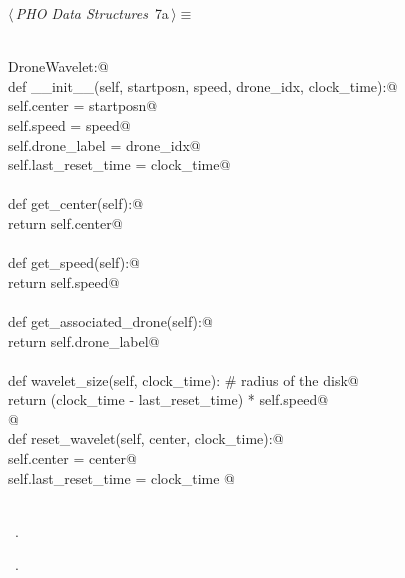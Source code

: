 \documentclass[12.0pt]{report}
\begin{document}
\begin{flushleft} \small
\begin{minipage}{\linewidth}\label{scrap2}\raggedright\small
{} $\langle\,${\itshape PHO Data Structures}\nobreak\ {\footnotesize {7a}}$\,\rangle\equiv$
\vspace{-1ex}
\begin{list}{}{} \item
\mbox{}\verb@@\\
\mbox{}\verb@class DroneWavelet:@\\
\mbox{}\verb@    def __init__(self, startposn, speed, drone_idx,  clock_time):@\\
\mbox{}\verb@          self.center          = startposn@\\
\mbox{}\verb@          self.speed           = speed@\\
\mbox{}\verb@          self.drone_label     = drone_idx@\\
\mbox{}\verb@          self.last_reset_time = clock_time@\\
\mbox{}\verb@@\\
\mbox{}\verb@    def get_center(self):@\\
\mbox{}\verb@          return self.center@\\
\mbox{}\verb@@\\
\mbox{}\verb@    def get_speed(self):@\\
\mbox{}\verb@          return self.speed@\\
\mbox{}\verb@@\\
\mbox{}\verb@    def get_associated_drone(self):@\\
\mbox{}\verb@          return self.drone_label@\\
\mbox{}\verb@@\\
\mbox{}\verb@    def wavelet_size(self, clock_time): # radius of the disk@\\
\mbox{}\verb@           return (clock_time - last_reset_time) * self.speed@\\
\mbox{}\verb@    @\\
\mbox{}\verb@    def reset_wavelet(self, center, clock_time):@\\
\mbox{}\verb@         self.center = center@\\
\mbox{}\verb@         self.last_reset_time = clock_time @\\
\mbox{}\verb@@\\
\mbox{}\verb@@{\NWsep}
\end{list}
\vspace{-1.5ex}
\footnotesize
\begin{list}{}{\setlength{\itemsep}{-\parsep}\setlength{\itemindent}{-\leftmargin}}
\item \NWtxtMacroDefBy\ .
\item \NWtxtMacroRefIn\ .

\item{}
\end{list}
\end{minipage}\vspace{4ex}
\end{flushleft}
\end{document}
